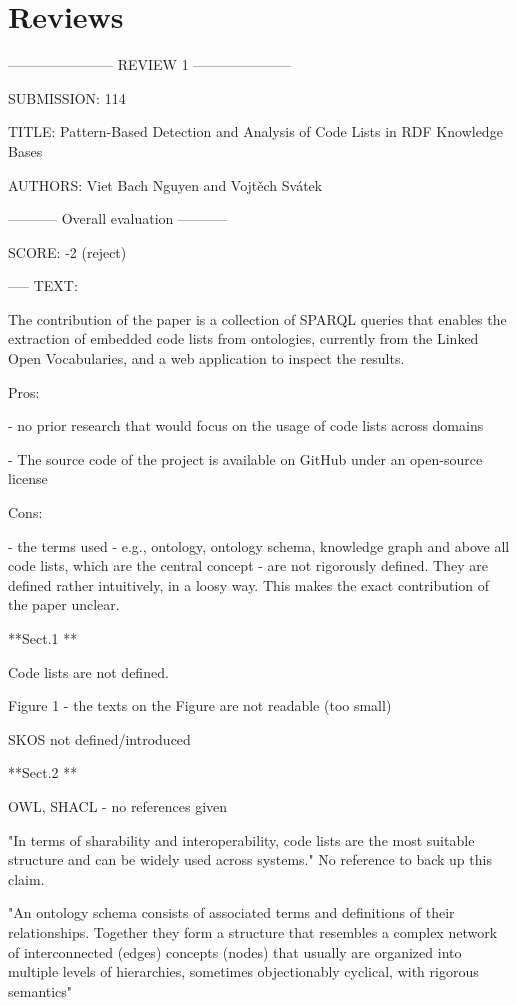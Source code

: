 \section*{Reviews}


----------------------- REVIEW 1 ---------------------

SUBMISSION: 114

TITLE: Pattern-Based Detection and Analysis of Code Lists in RDF Knowledge Bases

AUTHORS: Viet Bach Nguyen and Vojtěch Svátek

----------- Overall evaluation -----------

SCORE: -2 (reject)

----- TEXT:

The contribution of the paper  is a collection of SPARQL queries that enables the extraction of embedded code lists from ontologies, currently from the Linked Open Vocabularies, and a web application to inspect the results.

Pros:

- no prior research that would focus on the usage of code lists across domains

- The source code of the project is available on GitHub under an open-source license

Cons:

- the terms used - e.g., ontology, ontology schema, knowledge graph and above all code lists, which are the central concept - are not rigorously defined. They are defined rather intuitively, in a loosy way. This makes the exact contribution of the paper unclear.


**Sect.1 **

Code lists are not defined.

Figure 1 - the texts on the Figure are not readable (too small)

SKOS not defined/introduced 

**Sect.2 **

OWL, SHACL - no references given

"In terms of sharability and interoperability, code lists are the most suitable structure and can be widely used across systems." No reference to back up this claim.

"An ontology schema consists of associated terms and definitions of their relationships. Together they form a structure that resembles a complex network of interconnected (edges) concepts (nodes) that usually are organized into multiple levels of hierarchies, sometimes objectionably cyclical, with rigorous semantics"

